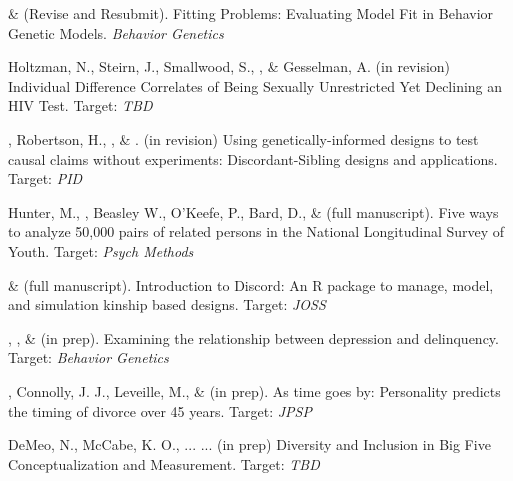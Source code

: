 


\item \meb \& \joe (Revise and Resubmit). Fitting Problems: Evaluating Model Fit in Behavior Genetic Models. \textit{Behavior Genetics}

\item Holtzman, N., Steirn, J., Smallwood, S., \meb, \& Gesselman, A. (in revision) Individual Difference Correlates of Being Sexually Unrestricted Yet Declining an HIV Test.  Target: \textit{TBD} %

\item \meb, Robertson, H.\noteA, \jt, \& \joe. (in revision) Using genetically-informed designs to test causal claims without experiments: Discordant-Sibling designs and applications. \href{https://osf.io/zpdwt/}{\small\color{blue}{osf.io/zpdwt/}} Target: \textit{PID} %


\item Hunter, M., \meb, Beasley W., O'Keefe, P.,  Bard, D., \& \Joe (full manuscript). Five ways to analyze 50,000 pairs of related persons in the National Longitudinal Survey of Youth.  Target: \textit{Psych Methods}

\item \jt \& \meb (full manuscript). Introduction to Discord: An R package to manage, model, and simulation kinship based designs. Target: \textit{JOSS}


\item \emsims, \jt, \& \meb (in prep). Examining the relationship between depression and delinquency. Target: \textit{Behavior Genetics}

\item \meb, Connolly, J. J., Leveille, M., \& \jjj (in prep). As time goes by: Personality predicts the timing of divorce over 45 years. Target: \textit{JPSP}
%


\item DeMeo, N., McCabe, K. O., ... \meb ... (in prep) Diversity and Inclusion in Big Five Conceptualization and Measurement.  Target: \textit{TBD}


